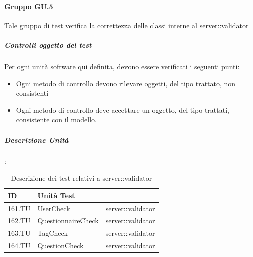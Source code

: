 \documentclass[12pt,a4paper]{article}
\begin{document}
\paragraph{Gruppo GU.5}
Tale gruppo di test verifica la correttezza delle classi interne al  server::validator
\subparagraph{Controlli oggetto del test}
Per ogni unità software qui definita, devono essere verificati i seguenti punti:
\begin{itemize}
	\item Ogni metodo di controllo devono rilevare oggetti, del tipo trattato, non consistenti
	\item Ogni metodo di controllo deve accettare un oggetto, del tipo trattati, consistente con il modello.
\end{itemize}
\subparagraph{Descrizione Unità}:
\begin{table}[H]
	\begin{center}
		\begin{tabular}{p{} p{} p{}}
			\toprule
			\textbf{ID}   & \textbf{Unità Test}	& \textbf{\mgls{package}} \\ \midrule
			\midrule
			161.TU & UserCheck & server::validator\\ \midrule
			162.TU & QuestionnaireCheck & server::validator\\ \midrule
			163.TU & TagCheck & server::validator\\ \midrule
			164.TU & QuestionCheck & server::validator\\ \midrule			
			\bottomrule
		\end{tabular}
	\end{center}
	\caption{Descrizione dei test relativi a server::validator}
\end{table}
\end{document}
